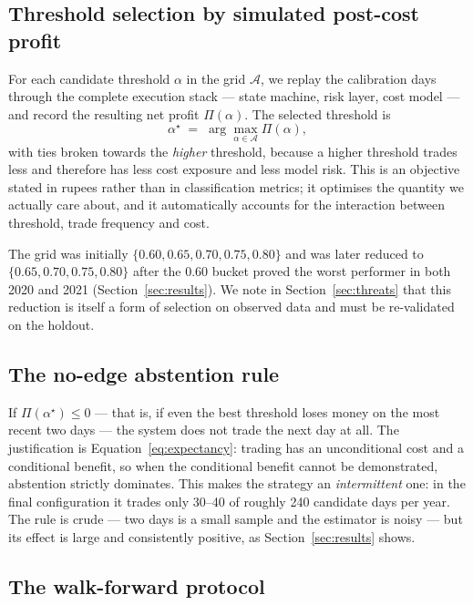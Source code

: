 \documentclass[11pt,a4paper]{article}
\begin{document}
\subsection{Threshold selection by simulated post-cost profit}

For each candidate threshold $\alpha$ in the grid $\mathcal{A}$, we replay the calibration
days through the complete execution stack --- state machine, risk layer, cost model ---
and record the resulting net profit $\Pi(\alpha)$. The selected threshold is
\begin{equation}
\alpha^{\star} \;=\; \arg\max_{\alpha\in\mathcal{A}} \Pi(\alpha),
\end{equation}
with ties broken towards the \emph{higher} threshold, because a higher threshold trades
less and therefore has less cost exposure and less model risk. This is an objective
stated in rupees rather than in classification metrics; it optimises the quantity we
actually care about, and it automatically accounts for the interaction between threshold,
trade frequency and cost.

The grid was initially $\{0.60,0.65,0.70,0.75,0.80\}$ and was later reduced to
$\{0.65,0.70,0.75,0.80\}$ after the $0.60$ bucket proved the worst performer in both
2020 and 2021 (Section~\ref{sec:results}). We note in Section~\ref{sec:threats} that
this reduction is itself a form of selection on observed data and must be re-validated
on the holdout.

\subsection{The no-edge abstention rule}

If $\Pi(\alpha^{\star}) \le 0$ --- that is, if even the best threshold loses money on the
most recent two days --- the system does not trade the next day at all. The justification
is Equation~\eqref{eq:expectancy}: trading has an unconditional cost and a conditional
benefit, so when the conditional benefit cannot be demonstrated, abstention strictly
dominates. This makes the strategy an \emph{intermittent} one: in the final configuration
it trades only 30--40 of roughly 240 candidate days per year. The rule is crude ---
two days is a small sample and the estimator is noisy --- but its effect is large and
consistently positive, as Section~\ref{sec:results} shows.

\subsection{The walk-forward protocol}
\end{document}
